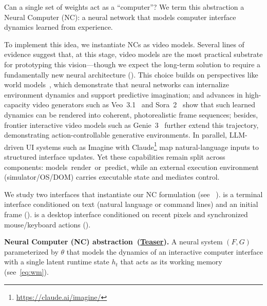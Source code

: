Can a single set of weights act as a ``computer''?  
We term this abstraction a Neural Computer (NC): a neural network that models computer interface dynamics learned from experience.


To implement this idea, we instantiate NCs as video models.
Several lines of evidence suggest that, at this stage, video models are the most practical substrate for prototyping this vision—though we expect the long-term solution to require a fundamentally new neural architecture ().
%
This choice builds on perspectives like world models~\citep{ha2018world}, which demonstrate that neural networks can internalize environment dynamics and support predictive imagination; 
and advances in high-capacity video generators such as Veo~3.1~\citep{google_veo3_1_2025} and Sora~2~\citep{openai_sora2_2025} show that such learned dynamics can be rendered into coherent, photorealistic frame sequences; besides, 
frontier interactive video models such as Genie~3~\citep{bruce2024genie} further extend this trajectory, demonstrating action-controllable generative environments.
% 
In parallel, LLM-driven UI systems such as Imagine with Claude\footnote{\url{https://claude.ai/imagine/}} map natural-language inputs to structured interface updates. 
Yet these capabilities remain split across components: models~render~or~predict, while an external execution environment (simulator/OS/DOM) carries executable state and mediates control.

We study two interfaces that instantiate our NC formulation (see ~). 
\nccligen{} is a terminal interface conditioned on text (natural language or command lines) and an initial frame (). 
\ncguiworld{} is a desktop interface conditioned on recent pixels and synchronized mouse/keyboard actions ().  
% 

\begin{tcolorbox}[
  colback=metablue!8,
  colframe=metablue!40,
  boxrule=0pt,
  borderline west={1pt}{0pt}{gray!60},
  left=6pt,right=4pt,top=3pt,bottom=3pt]
\small
\textbf{Neural Computer (NC) abstraction~(\hyperlink{teaser}{Teaser}).}
A neural system $(F, G)$ parameterized by $\theta$ that models the dynamics of an interactive computer interface 
with a single latent runtime state $h_t$ that acts as its working memory (see~\cref{eq:wm}).
\end{tcolorbox}


